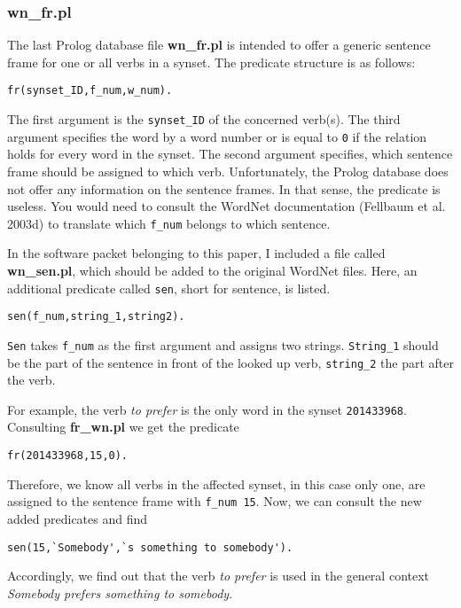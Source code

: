 \documentclass[12pt]{article}
\begin{document}
\subsubsection{wn\_fr.pl}

The last Prolog database file {\bfseries wn\_fr.pl} is intended to offer a generic sentence frame for one or all verbs in a synset.
The predicate structure is as follows:
\begin{verbatim}
fr(synset_ID,f_num,w_num).
\end{verbatim}
The first argument is the {\tt synset\_ID} of the concerned verb(s). The third argument specifies the word by a word number
or is equal to {\tt 0} if the relation holds for every word in the synset.
The second argument specifies, which sentence frame should be assigned to which verb.
Unfortunately, the Prolog database does not offer any information on the sentence frames. In that sense, the predicate
is useless. You would need to consult the WordNet documentation (Fellbaum et al. 2003d)
to translate which {\tt f\_num} belongs to which sentence.

In the software packet belonging to this paper, I included a file called {\bfseries wn\_sen.pl},
which should be added to the original WordNet files. Here, an additional predicate called {\tt sen}, short for sentence, is listed.
\begin{verbatim}
sen(f_num,string_1,string2).
\end{verbatim}
{\tt Sen} takes {\tt f\_num} as the first argument and assigns two strings. {\tt String\_1} should be the part of the sentence
in front of the looked up verb, {\tt string\_2} the part after the verb.

For example, the verb \emph{to prefer} is the only word in the synset {\tt 201433968}. Consulting {\bfseries fr\_wn.pl}
we get the predicate
\begin{verbatim}
fr(201433968,15,0).
\end{verbatim}
Therefore, we know all verbs in the affected synset, in this case only one, are assigned to the sentence frame with {\tt f\_num 15}.
Now, we can consult the new added predicates and find
\begin{verbatim}
sen(15,`Somebody',`s something to somebody').
\end{verbatim}
Accordingly, we find out that the verb \emph{to prefer} is used in the general context \emph{Somebody prefers something to somebody}.
\end{document}
